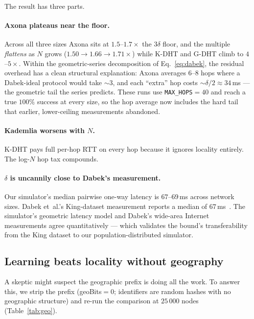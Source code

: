 \documentclass[conference]{IEEEtran}
\newcommand{\axona}{Axona\xspace}
\newcommand{\KDHT}{K-DHT\xspace}
\newcommand{\GDHT}{G-DHT\xspace}
\begin{document}
The result has three parts.

\paragraph{\axona plateaus near the floor.}
Across all three sizes \axona sits at $1.5$--$1.7\times$ the
$3\delta$ floor, and the multiple \emph{flattens} as $N$ grows
($1.50 \to 1.66 \to 1.71\times$) while \KDHT and \GDHT climb to
$4$--$5\times$.  Within the geometric-series decomposition of
Eq.~\ref{eq:dabek}, the residual overhead has a clean structural
explanation: \axona averages $6$--$8$ hops where a Dabek-ideal
protocol would take $\sim\!3$, and each ``extra'' hop costs
$\sim\!\delta/2 \approx 34$\,ms --- the geometric tail the series
predicts.  These runs use \texttt{MAX\_HOPS}$=40$ and reach a
true $100\%$ success at every size, so the hop average now
includes the hard tail that earlier, lower-ceiling measurements
abandoned.

\paragraph{Kademlia worsens with $N$.}
\KDHT pays full per-hop RTT on every hop because it ignores
locality entirely.  The log-$N$ hop tax compounds.

\paragraph{$\delta$ is uncannily close to Dabek's measurement.}
Our simulator's median pairwise one-way latency is $67$--$69$\,ms
across network sizes.  Dabek et~al.'s King-dataset measurement
reports a median of $67$\,ms~\cite{dabek2004designing}.  The
simulator's geometric latency model and Dabek's wide-area
Internet measurements agree quantitatively --- which validates
the bound's transferability from the King dataset to our
population-distributed simulator.

\subsection{Learning beats locality without geography}
\label{sec:eval-geo}

A skeptic might suspect the geographic prefix is doing all the
work.  To answer this, we strip the prefix (geoBits$=0$;
identifiers are random hashes with no geographic structure) and
re-run the comparison at $25\,000$ nodes
(Table~\ref{tab:geo}).
\end{document}
